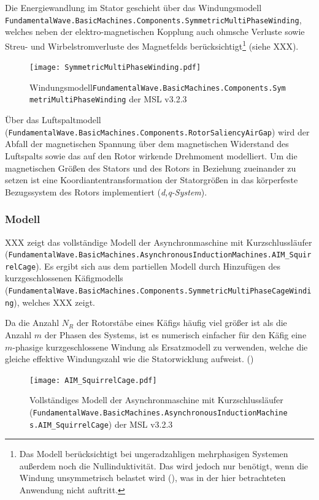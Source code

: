 Die Energiewandlung im Stator geschieht über das Windungsmodell
\texttt{FundamentalWave.BasicMachines.Components.SymmetricMultiPhaseWinding},
welches neben der elektro-magnetischen Kopplung auch ohmsche Verluste
sowie Streu- und Wirbelstromverluste des Magnetfelds
berücksichtigt\footnote{Das Modell berücksichtigt bei ungeradzahligen
  mehrphasigen Systemen außerdem noch die Nullinduktivität. Das wird
  jedoch nur benötigt, wenn die Windung unsymmetrisch belastet wird
  (\cite[S. 193]{kralModelicaObjektorientierteModellbildung2019}), was
  in der hier betrachteten Anwendung nicht auftritt.} (siehe XXX).

\begin{figure}
\centering
\texttt{[image: SymmetricMultiPhaseWinding.pdf]}
\caption{Windungsmodell\texttt{FundamentalWave.BasicMachines.Components.SymmetriMultiPhaseWinding}
der MSL v3.2.3}
\end{figure}

Über das Luftspaltmodell
(\texttt{FundamentalWave.BasicMachines.Components.RotorSaliencyAirGap})
wird der Abfall der magnetischen Spannung über dem magnetischen
Widerstand des Luftspalts sowie das auf den Rotor wirkende Drehmoment
modelliert. Um die magnetischen Größen des Stators und des Rotors in
Beziehung zueinander zu setzen ist eine Koordiantentransformation der
Statorgrößen in das körperfeste Bezugssystem des Rotors implementiert
(\emph{d,q-System}).

\hypertarget{modell}{%
\subsubsection{Modell}\label{modell}}

XXX zeigt das vollständige Modell der Asynchronmaschine mit
Kurzschlussläufer
(\texttt{FundamentalWave.BasicMachines.AsynchronousInductionMachines.AIM\_SquirrelCage}).
Es ergibt sich aus dem partiellen Modell durch Hinzufügen des
kurzgeschlossenen Käfigmodells
(\texttt{FundamentalWave.BasicMachines.Components.SymmetricMultiPhaseCageWinding}),
welches XXX zeigt.

Da die Anzahl \(N_R\) der Rotorstäbe eines Käfigs häufig viel größer ist
als die Anzahl \(m\) der Phasen des Systems, ist es numerisch einfacher
für den Käfig eine \(m\)-phasige kurzgeschlossene Windung als
Ersatzmodell zu verwenden, welche die gleiche effektive Windungszahl wie
die Statorwicklung aufweist.
(\cite[S. 194]{kralModelicaObjektorientierteModellbildung2019})

\begin{figure}
\centering
\texttt{[image: AIM\_SquirrelCage.pdf]}
\caption{Vollständiges Modell der Asynchronmaschine mit
Kurzschlussläufer
(\texttt{FundamentalWave.BasicMachines.AsynchronousInductionMachines.AIM\_SquirrelCage})
der MSL v3.2.3}
\end{figure}

